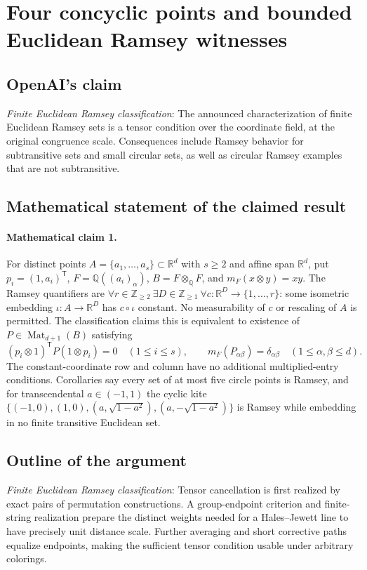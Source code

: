 \documentclass[11pt]{article}
\begin{document}
\section*{Four concyclic points and bounded Euclidean Ramsey witnesses}

\subsection{OpenAI's claim}
\textit{Finite Euclidean Ramsey classification}: The announced characterization of finite Euclidean Ramsey sets is a tensor condition over the coordinate field, at the original congruence scale. Consequences include Ramsey behavior for subtransitive sets and small circular sets, as well as circular Ramsey examples that are not subtransitive.

\subsection{Mathematical statement of the claimed result}
\paragraph{Mathematical claim 1.} For distinct points $A=\{a_1,\ldots,a_s\}\subset\mathbb R^d$ with $s\ge2$ and affine span $\mathbb R^d$, put $p_i=(1,a_i)^{\mathsf T}$, $F=\mathbb Q((a_i)_\alpha)$, $B=F\otimes_{\mathbb Q}F$, and $m_F(x\otimes y)=xy$. The Ramsey quantifiers are $\forall r\in\mathbb Z_{\ge2}\ \exists D\in\mathbb Z_{\ge1}\ \forall c:\mathbb R^D\to\{1,\ldots,r\}$: some isometric embedding $\iota:A\to\mathbb R^D$ has $c\circ\iota$ constant. No measurability of $c$ or rescaling of $A$ is permitted. The classification claims this is equivalent to existence of $P\in\operatorname{Mat}_{d+1}(B)$ satisfying \[(p_i\otimes1)^{\mathsf T}P(1\otimes p_i)=0\quad(1\le i\le s),\qquad m_F(P_{\alpha\beta})=\delta_{\alpha\beta}\quad(1\le\alpha,\beta\le d).\] The constant-coordinate row and column have no additional multiplied-entry conditions. Corollaries say every set of at most five circle points is Ramsey, and for transcendental $a\in(-1,1)$ the cyclic kite $\{(-1,0),(1,0),(a,\sqrt{1-a^2}),(a,-\sqrt{1-a^2})\}$ is Ramsey while embedding in no finite transitive Euclidean set.

\subsection{Outline of the argument}
\textit{Finite Euclidean Ramsey classification}: Tensor cancellation is first realized by exact pairs of permutation constructions. A group-endpoint criterion and finite-string realization prepare the distinct weights needed for a Hales--Jewett line to have precisely unit distance scale. Further averaging and short corrective paths equalize endpoints, making the sufficient tensor condition usable under arbitrary colorings.
\end{document}
